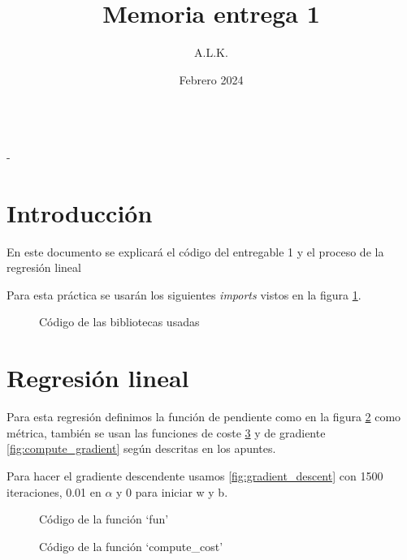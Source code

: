 \documentclass[6pt]{../../shared/AiTex}
\title{Memoria entrega 1}
\author{A.L.K.}
\date{Febrero 2024}
\begin{document}
\justify

\begin{center}

    {\huge \textbf{\underline{\subtitulo}}} \\
    { \lesson - \autor}

\end{center}


\section*{Introducción}

En este documento se explicará el código del entregable 1 y el proceso de la regresión lineal

Para esta práctica se usarán los siguientes \textit{imports} vistos en la figura \ref{fig:imports}.
\begin{figure}[H]
    \centering
    
    \caption{Código de las bibliotecas usadas}
    \label{fig:imports}
\end{figure}

\section{Regresión lineal}

Para esta regresión definimos la función de pendiente como en la figura \ref{fig:fun} como métrica, también se usan las funciones de coste \ref{fig:compute_cost} y de gradiente \ref{fig:compute_gradient} según descritas en los apuntes.

Para hacer el gradiente descendente usamos \ref{fig:gradient_descent} con 1500 iteraciones, 0.01 en $\alpha$ y 0 para iniciar w y b.

\begin{figure}[H]
    \centering
    
    \caption{Código de la función `fun'}
    \label{fig:fun}
\end{figure}

\begin{figure}[H]
    \centering
    
    \caption{Código de la función `compute\_cost'}
    \label{fig:compute_cost}
\end{figure}
\end{document}
